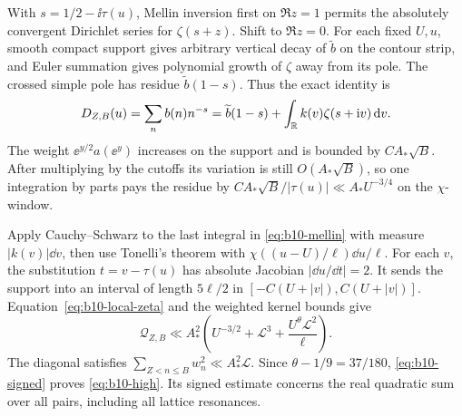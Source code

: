 With \(s=1/2-\ii\tau(u)\), Mellin inversion first on \(\Re z=1\)
permits the absolutely convergent Dirichlet series for
\(\zeta(s+z)\). Shift to \(\Re z=0\). For each fixed \(U,u\), smooth
compact support gives arbitrary vertical decay of \(\widetilde b\) on
the contour strip, and Euler summation gives polynomial growth of
\(\zeta\) away from its pole. The crossed simple pole has residue
\(\widetilde b(1-s)\). Thus the exact identity is
\begin{equation}\label{eq:b10-mellin}
 D_{Z,B}(u)=\sum_n b(n)n^{-s}
   =\widetilde b(1-s)+\int_\mathbb R k(v)\zeta(s+\mathrm i v)\,\mathrm d v .
\end{equation}
The weight \(\ee^{y/2}a(\ee^y)\) increases on the support and is bounded
by \(C A_*\sqrt B\). After multiplying by the cutoffs its variation is
still \(O(A_*\sqrt B)\), so one integration by parts pays the residue
by \(C A_*\sqrt B/|\tau(u)|\ll A_*U^{-3/4}\) on the \(\chi\)-window.

Apply Cauchy--Schwarz to the last integral in \eqref{eq:b10-mellin}
with measure \(|k(v)|\dd v\), then use Tonelli's theorem with
\(\chi((u-U)/\ell)\dd u/\ell\). For each \(v\), the substitution
\(t=v-\tau(u)\) has absolute Jacobian \(|\dd u/\dd t|=2\).
It sends the support into an interval of length \(5\ell/2\)
in \([-C(U+|v|),C(U+|v|)]\).
Equation~\eqref{eq:b10-local-zeta} and the weighted kernel bounds give
\[
 \mathcal Q_{Z,B}
 \ll A_*^2\left(U^{-3/2}+\mathcal L^3+
                      \frac{U^\theta\mathcal L^2}{\ell}\right).
\]
The diagonal satisfies \(\sum_{Z<n\le B}w_n^2\ll A_*^2\mathcal L\).
Since \(\theta-1/9=37/180\), \eqref{eq:b10-signed} proves
\eqref{eq:b10-high}. Its signed estimate concerns the real quadratic
sum over all pairs, including all lattice resonances.

